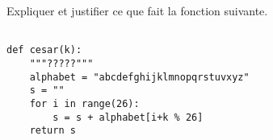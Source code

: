 \exer{}
\setcounter{numques}{0}

Expliquer et justifier ce que fait la fonction suivante. 
\begin{lstlisting}

def cesar(k):
    """?????"""
    alphabet = "abcdefghijklmnopqrstuvxyz"
    s = ""
    for i in range(26):
        s = s + alphabet[i+k % 26]
    return s
\end{lstlisting}

